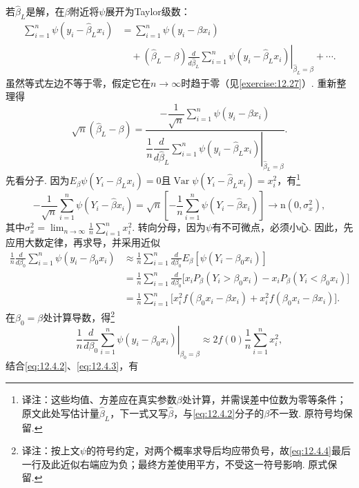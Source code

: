 \begin{example}[LAD估计量的渐近正态性]
若$\hat\beta_L$是解，在$\beta$附近将$\psi$展开为Taylor级数：
$$\begin{aligned}
\sum_{i=1}^n\psi(y_i-\hat\beta_Lx_i)
&=\sum_{i=1}^n\psi(y_i-\beta x_i)\\
&\quad+(\hat\beta_L-\beta)\left.\frac d{d\hat\beta_L}\sum_{i=1}^n\psi(y_i-\hat\beta_Lx_i)\right|_{\hat\beta_L=\beta}+\cdots.
\end{aligned}$$
虽然等式左边不等于零，假定它在$n\to\infty$时趋于零（见\autoref{exercise:12.27}）. 重新整理得
\begin{equation}\label{eq:12.4.2}
\sqrt n(\hat\beta_L-\beta)=
\frac{-\dfrac1{\sqrt n}\sum_{i=1}^n\psi(y_i-\beta x_i)}
{\left.\dfrac1n\dfrac d{d\hat\beta_L}\sum_{i=1}^n\psi(y_i-\hat\beta_Lx_i)\right|_{\hat\beta_L=\beta}}.
\end{equation}
先看分子. 因为$E_\beta\psi(Y_i-\hat\beta_Lx_i)=0$且$\operatorname{Var}\psi(Y_i-\hat\beta_Lx_i)=x_i^2$，有\footnote{译注：这些均值、方差应在真实参数$\beta$处计算，并需误差中位数为零等条件；原文此处写估计量$\hat\beta_L$，下一式又写$\hat\beta$，与\eqref{eq:12.4.2}分子的$\beta$不一致. 原符号均保留.}
\begin{equation}\label{eq:12.4.3}
-\frac1{\sqrt n}\sum_{i=1}^n\psi(Y_i-\hat\beta x_i)
=\sqrt n\left[-\frac1n\sum_{i=1}^n\psi(Y_i-\hat\beta x_i)\right]
\to\mathrm n(0,\sigma_x^2),
\end{equation}
其中$\sigma_x^2=\lim_{n\to\infty}\frac1n\sum_{i=1}^nx_i^2$. 转向分母，因为$\psi$有不可微点，必须小心. 因此，先应用大数定律，再求导，并采用近似
\begin{equation}\label{eq:12.4.4}
\begin{aligned}
\frac1n\frac d{d\beta_0}\sum_{i=1}^n\psi(y_i-\beta_0x_i)
&\approx\frac1n\sum_{i=1}^n\frac d{d\beta_0}E_\beta[\psi(Y_i-\beta_0x_i)]\\
&=\frac1n\sum_{i=1}^n\frac d{d\beta_0}\bigl[x_iP_\beta(Y_i>\beta_0x_i)-x_iP_\beta(Y_i<\beta_0x_i)\bigr]\\
&=\frac1n\sum_{i=1}^n\bigl[x_i^2f(\beta_0x_i-\beta x_i)+x_i^2f(\beta_0x_i-\beta x_i)\bigr].
\end{aligned}
\end{equation}
在$\beta_0=\beta$处计算导数，得\footnote{译注：按上文$\psi$的符号约定，对两个概率求导后均应带负号，故\eqref{eq:12.4.4}最后一行及此近似右端应为负；最终方差使用平方，不受这一符号影响. 原式保留.}
$$\left.\frac1n\frac d{d\beta_0}\sum_{i=1}^n\psi(y_i-\beta_0x_i)\right|_{\beta_0=\beta}
\approx2f(0)\frac1n\sum_{i=1}^nx_i^2,$$
结合\eqref{eq:12.4.2}、\eqref{eq:12.4.3}，有
\begin{equation}\label{eq:12.4.5}

\end{equation}
\end{example}
